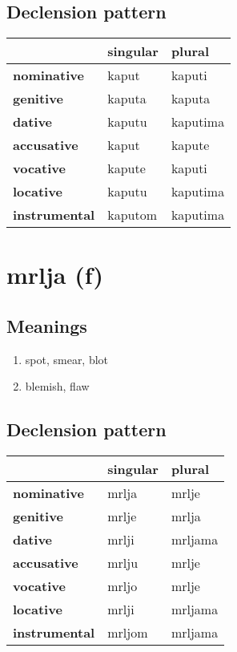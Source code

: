 \subsection*{Declension pattern}
\begin{tabularx}{\linewidth}{Xll}
\toprule
{} & singular &    plural \\
\midrule
\textbf{nominative  } &    kaput &    kaputi \\
\textbf{genitive    } &   kaputa &    kaputa \\
\textbf{dative      } &   kaputu &  kaputima \\
\textbf{accusative  } &    kaput &    kapute \\
\textbf{vocative    } &   kapute &    kaputi \\
\textbf{locative    } &   kaputu &  kaputima \\
\textbf{instrumental} &  kaputom &  kaputima \\
\bottomrule
\end{tabularx}

\filbreak
\section{mrlja (f)}
\subsection*{Meanings}
\begin{enumerate}
\item spot, smear, blot
\item blemish, flaw
\end{enumerate}
\subsection*{Declension pattern}
\begin{tabularx}{\linewidth}{Xll}
\toprule
{} & singular &   plural \\
\midrule
\textbf{nominative  } &    mrlja &    mrlje \\
\textbf{genitive    } &    mrlje &    mrlja \\
\textbf{dative      } &    mrlji &  mrljama \\
\textbf{accusative  } &    mrlju &    mrlje \\
\textbf{vocative    } &    mrljo &    mrlje \\
\textbf{locative    } &    mrlji &  mrljama \\
\textbf{instrumental} &   mrljom &  mrljama \\
\bottomrule
\end{tabularx}

